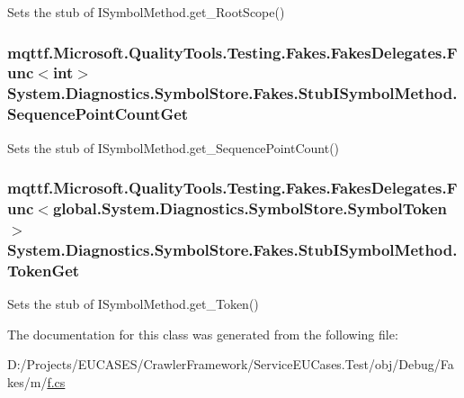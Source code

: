 Sets the stub of I\-Symbol\-Method.\-get\-\_\-\-Root\-Scope()

\hypertarget{class_system_1_1_diagnostics_1_1_symbol_store_1_1_fakes_1_1_stub_i_symbol_method_a751104cc9d0cfb26312f9e586f133297}{
\subsubsection[{Sequence\-Point\-Count\-Get}]{\setlength{\rightskip}{0pt plus 5cm}mqttf.\-Microsoft.\-Quality\-Tools.\-Testing.\-Fakes.\-Fakes\-Delegates.\-Func$<$int$>$ System.\-Diagnostics.\-Symbol\-Store.\-Fakes.\-Stub\-I\-Symbol\-Method.\-Sequence\-Point\-Count\-Get}}\label{class_system_1_1_diagnostics_1_1_symbol_store_1_1_fakes_1_1_stub_i_symbol_method_a751104cc9d0cfb26312f9e586f133297}


Sets the stub of I\-Symbol\-Method.\-get\-\_\-\-Sequence\-Point\-Count()

\hypertarget{class_system_1_1_diagnostics_1_1_symbol_store_1_1_fakes_1_1_stub_i_symbol_method_ac399eaaf7ed540d71b207e6a08a47a63}{
\subsubsection[{Token\-Get}]{\setlength{\rightskip}{0pt plus 5cm}mqttf.\-Microsoft.\-Quality\-Tools.\-Testing.\-Fakes.\-Fakes\-Delegates.\-Func$<$global.\-System.\-Diagnostics.\-Symbol\-Store.\-Symbol\-Token$>$ System.\-Diagnostics.\-Symbol\-Store.\-Fakes.\-Stub\-I\-Symbol\-Method.\-Token\-Get}}\label{class_system_1_1_diagnostics_1_1_symbol_store_1_1_fakes_1_1_stub_i_symbol_method_ac399eaaf7ed540d71b207e6a08a47a63}


Sets the stub of I\-Symbol\-Method.\-get\-\_\-\-Token()



The documentation for this class was generated from the following file\-:\begin{DoxyCompactItemize}
\item 
D\-:/\-Projects/\-E\-U\-C\-A\-S\-E\-S/\-Crawler\-Framework/\-Service\-E\-U\-Cases.\-Test/obj/\-Debug/\-Fakes/m/\hyperlink{m_2f_8cs}{f.\-cs}\end{DoxyCompactItemize}
